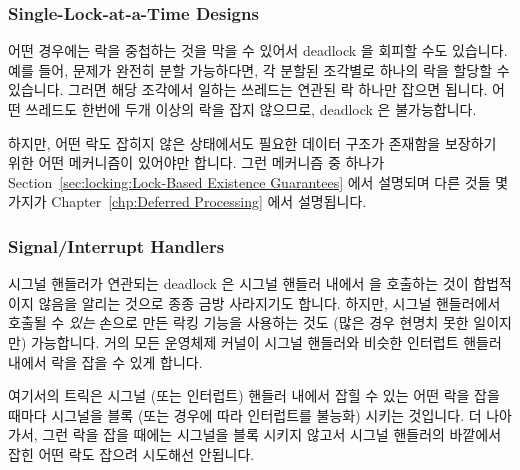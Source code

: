 \fi

\subsubsection{Single-Lock-at-a-Time Designs}
\label{sec:locking:Single-Lock-at-a-Time Designs}

어떤 경우에는 락을 중첩하는 것을 막을 수 있어서 deadlock 을 회피할 수도
있습니다.
예를 들어, 문제가 완전히 분할 가능하다면, 각 분할된 조각별로 하나의 락을 할당할
수 있습니다.
그러면 해당 조각에서 일하는 쓰레드는 연관된 락 하나만 잡으면 됩니다.
어떤 쓰레드도 한번에 두개 이상의 락을 잡지 않으므로, deadlock 은 불가능합니다.

하지만, 어떤 락도 잡히지 않은 상태에서도 필요한 데이터 구조가 존재함을 보장하기
위한 어떤 메커니즘이 있어야만 합니다.
그런 메커니즘 중 하나가
Section~\ref{sec:locking:Lock-Based Existence Guarantees}
에서 설명되며 다른 것들 몇가지가
Chapter~\ref{chp:Deferred Processing}
에서 설명됩니다.

\subsubsection{Signal/Interrupt Handlers}
\label{sec:locking:Signal/Interrupt Handlers}

시그널 핸들러가 연관되는 deadlock 은 시그널 핸들러 내에서
 을 호출하는 것이 합법적이지 않음을 알리는 것으로 종종
금방 사라지기도 합니다.
하지만, 시그널 핸들러에서 호출될 수 \emph{있는} 손으로 만든 락킹 기능을
사용하는 것도 (많은 경우 현명치 못한 일이지만) 가능합니다.
거의 모든 운영체제 커널이 시그널 핸들러와 비슷한 인터럽트 핸들러 내에서 락을
잡을 수 있게 합니다.

여기서의 트릭은 시그널 (또는 인터럽트) 핸들러 내에서 잡힐 수 있는 어떤 락을
잡을 때마다 시그널을 블록 (또는 경우에 따라 인터럽트를 불능화) 시키는 것입니다.
더 나아가서, 그런 락을 잡을 때에는 시그널을 블록 시키지 않고서 시그널 핸들러의
바깥에서 잡힌 어떤 락도 잡으려 시도해선 안됩니다.

